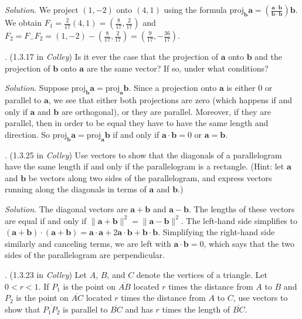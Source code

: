 \documentclass[11pt]{article}
\theoremstyle{definition}
\newcounter{prob}
\newcommand\itm{\theprob.  \stepcounter{prob}}
\newcommand\sol[2]{\textit{Solution}. #1}
\newcommand\sol[2]{#2}
\begin{document}
\sol{
  We project $(1,-2)$ onto $(4,1)$ using the formula $\text{proj}_\mathbf{b}\mathbf{a}=\left(\frac{\mathbf{a}\cdot \mathbf{b}}{\mathbf{b}\cdot \mathbf{b}}\right)\mathbf{b}$. We obtain $F_1=\frac{2}{17}(4,1)=(\frac{8}{17},\frac{2}{17})$ and $F_2=F_-F_2=(1,-2)-\left(\frac{8}{17},\frac{2}{17}\right)=\left(\frac{9}{17},-\frac{36}{17}\right)$. 
}{
\vfill
}

\itm (1.3.17 in \textit{Colley}) Is it ever the case that the projection of $\mathbf{a}$ onto $\mathbf{b}$ and the projection of $\mathbf{b}$ onto $\mathbf{a}$ are the same vector? If so, under what conditions? 

\sol{Suppose $\text{proj}_\mathbf{b}\mathbf{a}=\text{proj}_\mathbf{a}\mathbf{b}$. Since a projection onto $\mathbf{a}$ is either 0 or parallel to $\mathbf{a}$, we see that either both projections are zero (which happens if and only if $\mathbf{a}$ and $\mathbf{b}$ are orthogonal), or they are parallel. Moreover, if they are parallel, then in order to be equal they have to have the same length and direction. So $\text{proj}_\mathbf{b}\mathbf{a}=\text{proj}_\mathbf{a}\mathbf{b}$ if and only if $\mathbf{a}\cdot \mathbf{b} = 0$ or $\mathbf{a}=\mathbf{b}$.} { \vfill }

\newpage 

\itm (1.3.25 in \textit{Colley}) Use vectors to show that the diagonals of a parallelogram have the same length if and only if the parallelogram is a rectangle. (Hint: let $\mathbf{a}$ and $\mathbf{b}$ be vectors along two sides of the parallelogram, and express vectors running along the diagonals in terms of $\mathbf{a}$ and $\mathbf{b}$.) 

\sol{
  The diagonal vectors are $\mathbf{a}+\mathbf{b}$ and $\mathbf{a}-\mathbf{b}$. The lengths of these vectors are equal if and only if $\|\mathbf{a}+\mathbf{b}\|^2=\|\mathbf{a}-\mathbf{b}\|^2$. The left-hand side simplifies to $(\mathbf{a}+\mathbf{b})\cdot (\mathbf{a}+\mathbf{b})=\mathbf{a}\cdot \mathbf{a} + 2 \mathbf{a}\cdot \mathbf{b}+\mathbf{b}\cdot \mathbf{b}$. Simplifying the right-hand side similarly and canceling terms, we are left with $\mathbf{a}\cdot \mathbf{b}=0$, which says that the two sides of the parallelogram are perpendicular. 
}{
\vfill
}

\itm (1.3.23 in \textit{Colley}) Let $A$, $B$, and $C$ denote the vertices of a triangle. Let $0<r<1$. If $P_1$ is the point on $\overline{AB}$ located $r$ times the distance from $A$ to $B$ and $P_2$ is the point on $\overline{AC}$ located $r$ times the distance from $A$ to $C$, use vectors to show that $\overline{P_1P_2}$ is parallel to $\overline{BC}$ and has $r$ times the length of $\overline{BC}$. 
\end{document}
